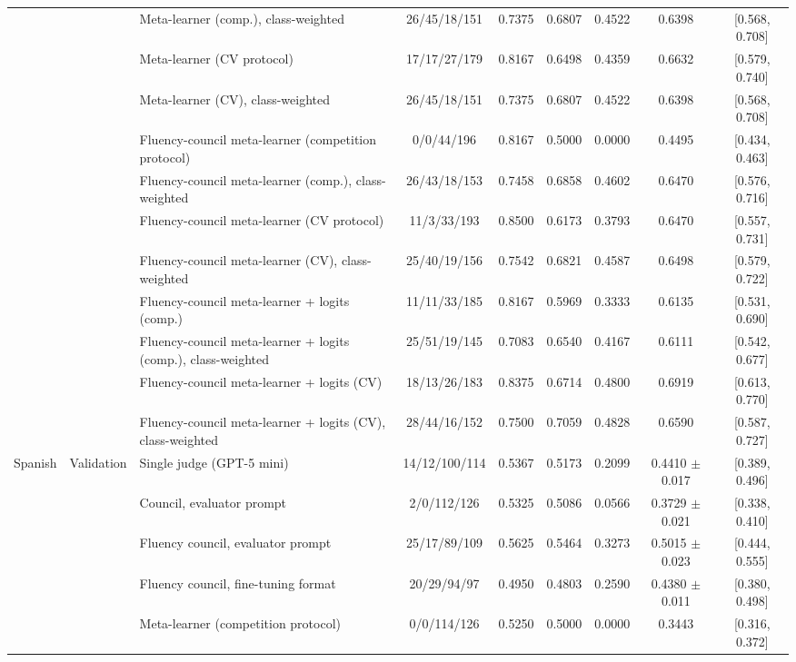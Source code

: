 \begin{tabular}{lllcccccc}
 &  & Meta-learner (comp.), class-weighted & 26/45/18/151 & 0.7375 & 0.6807 & 0.4522 & 0.6398 & [0.568, 0.708] \\
 &  & Meta-learner (CV protocol) & 17/17/27/179 & 0.8167 & 0.6498 & 0.4359 & 0.6632 & [0.579, 0.740] \\
 &  & Meta-learner (CV), class-weighted & 26/45/18/151 & 0.7375 & 0.6807 & 0.4522 & 0.6398 & [0.568, 0.708] \\
 &  & Fluency-council meta-learner (competition protocol) & 0/0/44/196 & 0.8167 & 0.5000 & 0.0000 & 0.4495 & [0.434, 0.463] \\
 &  & Fluency-council meta-learner (comp.), class-weighted & 26/43/18/153 & 0.7458 & 0.6858 & 0.4602 & 0.6470 & [0.576, 0.716] \\
 &  & Fluency-council meta-learner (CV protocol) & 11/3/33/193 & 0.8500 & 0.6173 & 0.3793 & 0.6470 & [0.557, 0.731] \\
 &  & Fluency-council meta-learner (CV), class-weighted & 25/40/19/156 & 0.7542 & 0.6821 & 0.4587 & 0.6498 & [0.579, 0.722] \\
 &  & Fluency-council meta-learner + logits (comp.) & 11/11/33/185 & 0.8167 & 0.5969 & 0.3333 & 0.6135 & [0.531, 0.690] \\
 &  & Fluency-council meta-learner + logits (comp.), class-weighted & 25/51/19/145 & 0.7083 & 0.6540 & 0.4167 & 0.6111 & [0.542, 0.677] \\
 &  & Fluency-council meta-learner + logits (CV) & 18/13/26/183 & 0.8375 & 0.6714 & 0.4800 & 0.6919 & [0.613, 0.770] \\
 &  & Fluency-council meta-learner + logits (CV), class-weighted & 28/44/16/152 & 0.7500 & 0.7059 & 0.4828 & 0.6590 & [0.587, 0.727] \\
\hline
Spanish & Validation & Single judge (GPT-5 mini) & 14/12/100/114 & 0.5367 & 0.5173 & 0.2099 & 0.4410 $\pm$ 0.017 & [0.389, 0.496] \\
 &  & Council, evaluator prompt & 2/0/112/126 & 0.5325 & 0.5086 & 0.0566 & 0.3729 $\pm$ 0.021 & [0.338, 0.410] \\
 &  & Fluency council, evaluator prompt & 25/17/89/109 & 0.5625 & 0.5464 & 0.3273 & 0.5015 $\pm$ 0.023 & [0.444, 0.555] \\
 &  & Fluency council, fine-tuning format & 20/29/94/97 & 0.4950 & 0.4803 & 0.2590 & 0.4380 $\pm$ 0.011 & [0.380, 0.498] \\
 &  & Meta-learner (competition protocol) & 0/0/114/126 & 0.5250 & 0.5000 & 0.0000 & 0.3443 & [0.316, 0.372] \\

\end{tabular}
